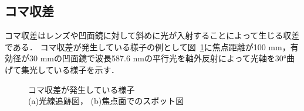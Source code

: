 \subsection{コマ収差}
コマ収差はレンズや凹面鏡に対して斜めに光が入射することによって生じる収差である．
コマ収差が発生している様子の例として図\ \ref{fig:koma_syuusa}に焦点距離が100 mm，有効径が30 mmの凹面鏡で波長587.6 nmの平行光を軸外反射によって光軸を30°曲げて集光している様子を示す．
\begin{figure}
    \caption{コマ収差が発生している様子 \\
    (a)光線追跡図，
    (b)焦点面でのスポット図}
    \label{fig:koma_syuusa}
\end{figure}

